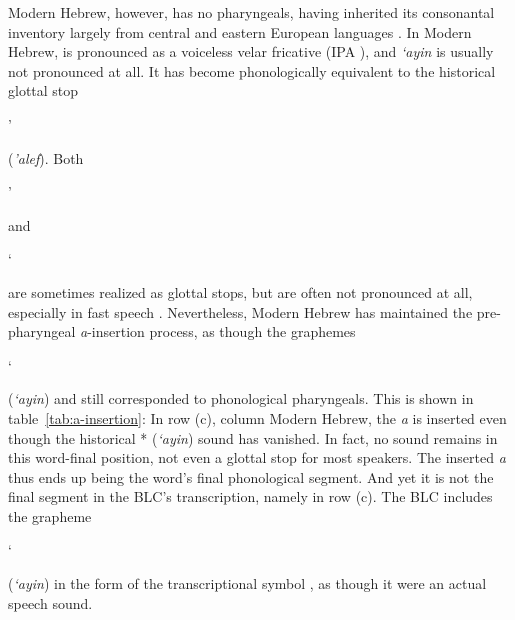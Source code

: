 Modern Hebrew, however, has no pharyngeals, having 
inherited its consonantal inventory 
largely from central and eastern European languages 
\citep{montoya:2014}. 
In Modern Hebrew, \textipa{[\textcrh]} 
is pronounced as a voiceless velar fricative 
(IPA \textipa{[x]}), and \textit{`ayin} 
is usually not pronounced at all. It has become 
phonologically 
equivalent to the historical glottal stop 
\begin{cjhebrew}'\end{cjhebrew} 
(\textit{'alef}). Both \begin{cjhebrew}'\end{cjhebrew} and 
\begin{cjhebrew}`\end{cjhebrew} 
are sometimes realized as glottal stops, but are 
often not pronounced at all, 
especially in fast speech \citep{matras-and-schiff:2005,berman:1985}. 
Nevertheless, Modern Hebrew has maintained the pre-pharyngeal 
\textit{a}-insertion process, as though the graphemes 
\begin{cjhebrew}`\end{cjhebrew} (\textit{`ayin}) and 
\textit{} still corresponded 
to phonological pharyngeals. This is shown in table~\ref{tab:a-insertion}:
In row (c), column Modern Hebrew, the \textit{a} is inserted 
even though the historical *\textipa{\textrevglotstop} 
(\textit{`ayin}) sound has vanished. In fact, no sound remains in this 
word-final position, not even a glottal stop for most 
speakers. The inserted \textit{a} thus ends up being the 
word's final phonological segment. And yet it is not the final segment
in the \ac{BLC}'s transcription, namely  in row (c). 
The \ac{BLC} includes the grapheme \begin{cjhebrew}`\end{cjhebrew} 
(\textit{`ayin}) in the form of the transcriptional 
symbol \textipa{[\textrevglotstop]}, as though it
were an actual speech sound.

